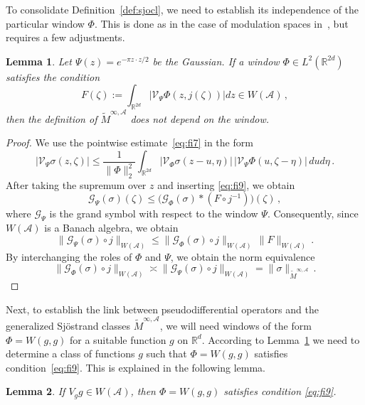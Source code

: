 \documentclass[12pt]{amsart}
\newtheorem{lemma}{Lemma}[section]
\theoremstyle{definition}
\theoremstyle{remark}
\numberwithin{equation}{section}
\newcommand{\modsp}{modulation space}
\newcommand{\symbo}{\widetilde M^{\infty, \cA}}
\def\cA{\mathcal{A}}
\def\bR{{\mathbb{R}}}
\def\rd{\bR^d}
\def\rdd{{\bR^{2d}}}
\def\lrdd{L^2(\rdd)}
\def\intrdd{\int_{\rdd}}
\def\inv{^{-1}}
\def\cA{\mathcal{A}}
\def\cV{\mathcal{V}}
\newcommand{\Cal}{\mathcal}
\begin{document}
To consolidate Definition~\ref{def:sjocl}, we need to establish its 
independence of the particular window $\Phi $. This is done as in the
case of \modsp s in~\cite[Ch.~11.3,11.4]{book}, but requires a few adjustments. 

\begin{lemma}\label{lemind}
Let $\Psi(z) = e^{-\pi z\cdot z/2}$ be the Gaussian. If a window $\Phi \in \lrdd $ satisfies the condition
\begin{equation}
  \label{eq:fi9}
  F(\zeta ) := \intrdd |\cV _\Psi \Phi (z,j(\zeta ))| dz \in W(\cA )
  \, ,
\end{equation}
then the definition of $\symbo $ does  not depend on the window.   
\end{lemma}

\begin{proof}
  We use the pointwise estimate~\eqref{eq:fi7} in the form
$$
|\cV _\Psi \sigma (z,\zeta )| \leq \frac{1}{\|\Phi \|_2^2}  \intrdd |\cV _\Phi
\sigma (z-u, \eta  ) | \, |\cV _\Psi \Phi (u, \zeta -\eta) | \,du
d\eta \, .
$$
After taking the supremum over $z$ and inserting \eqref{eq:fi9},  we
obtain
$$
\Cal G_\Psi (\sigma ) (\zeta ) \leq \Big( \Cal G_\Phi (\sigma )  \ast (F\circ j\inv)
\Big)(\zeta ) \, ,
$$
where $\Cal G_\Psi $ is the grand symbol with respect to the window $\Psi
$. 
Consequently, since $W(\cA )$ is a Banach algebra, we obtain
$$
\|\Cal G_\Psi (\sigma )\circ j \|_{W(\cA )} \leq \|\Cal G_\Phi (\sigma )\circ j\|_{W(\cA ) } \,
\|F\|_{W(\cA    )}\, .$$
By interchanging the roles of $\Phi $ and $\Psi $, we obtain the norm
equivalence
$$
\|\Cal G_\Phi (\sigma )\circ j \|_{W(\cA )} \asymp \|\Cal G_\Psi (\sigma ) \circ j\|_{W(\cA )}
= \|\sigma \|_{\symbo } \, .
$$
\end{proof}

Next, to establish the link between pseudodifferential operators and
the generalized Sj\"ostrand classes $\symbo $, we will need windows of
the form $\Phi = W(g,g)$ for a suitable function $g$ on $\rd
$. According to Lemma~\ref{lemind} we need to determine a class of
functions $g$ such that $\Phi = W(g,g)$ satisfies
condition~\eqref{eq:fi9}. This is explained in the following lemma.

\begin{lemma}
  \label{lem:htht}
If $V_gg \in W(\cA )$, then $\Phi = W(g,g)$ satisfies condition
\eqref{eq:fi9}. 
\end{lemma}
\end{document}
